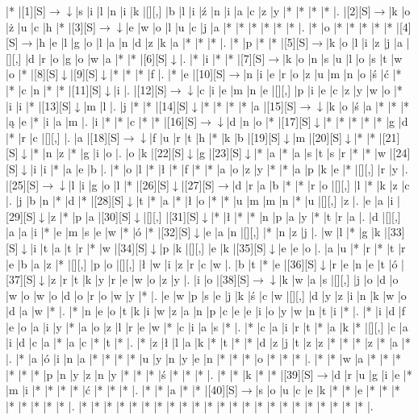 \documentclass[11pt]{article}
\newcommand\drarr{$\rightarrow \!\!\!\!\! \downarrow$}
\newcommand\rarr{$\rightarrow$}
\newcommand\darr{$\downarrow$}
\begin{document}
\noindent\begin{Puzzle}{22}{29}|*	|[1][S]\drarr	|s	|i	|l	|n	|i	|k	|[][,]{ }	|b	|l	|i	|ź	|n	|i	|a	|c	|z	|y	|*	|*	|*	|*	|.
|[2][S]\rarr	|k	|o	|ż	|u	|c	|h	|*	|[3][S]\drarr	|e	|w	|o	|l	|u	|c	|j	|a	|*	|*	|*	|*	|*	|*	|.
|*	|o	|*	|*	|*	|*	|*	|[4][S]\rarr	|h	|e	|l	|g	|o	|l	|a	|n	|d	|z	|k	|a	|*	|*	|*	|.
|*	|p	|*	|*	|[5][S]\rarr	|k	|o	|l	|i	|z	|j	|a	|[][,]{ }	|d	|r	|o	|g	|o	|w	|a	|*	|*	|[6][S]\darr	|.
|*	|i	|*	|*	|[7][S]\rarr	|k	|o	|n	|s	|u	|l	|o	|s	|t	|w	|o	|*	|[8][S]\darr	|[9][S]\darr	|*	|*	|*	|f	|.
|*	|e	|[10][S]\rarr	|n	|i	|e	|r	|o	|z	|u	|m	|n	|o	|ś	|ć	|*	|*	|c	|n	|*	|*	|[11][S]\darr	|i	|.
|[12][S]\drarr	|c	|i	|e	|m	|n	|e	|[][,]{ }	|p	|i	|e	|c	|z	|y	|w	|o	|*	|i	|i	|*	|[13][S]\darr	|m	|l	|.
|j	|*	|*	|[14][S]\darr	|*	|*	|*	|*	|a	|[15][S]\drarr	|k	|o	|ś	|a	|*	|*	|*	|ą	|e	|*	|i	|a	|m	|.
|i	|*	|*	|c	|*	|*	|[16][S]\drarr	|d	|n	|o	|*	|[17][S]\darr	|*	|*	|*	|*	|*	|g	|d	|*	|r	|c	|[][,]{ }	|.
|a	|[18][S]\drarr	|f	|u	|r	|t	|h	|*	|k	|b	|[19][S]\darr	|m	|[20][S]\darr	|*	|*	|[21][S]\darr	|*	|n	|z	|*	|g	|i	|o	|.
|o	|k	|[22][S]\darr	|g	|[23][S]\darr	|*	|a	|*	|a	|s	|t	|s	|r	|*	|*	|w	|[24][S]\darr	|i	|i	|*	|a	|e	|b	|.
|*	|o	|l	|*	|ł	|*	|f	|*	|*	|a	|o	|z	|y	|*	|*	|a	|p	|k	|e	|*	|[][,]{ }	|r	|y	|.
|[25][S]\drarr	|l	|i	|g	|o	|l	|*	|[26][S]\darr	|[27][S]\rarr	|d	|r	|a	|b	|*	|*	|r	|o	|[][,]{ }	|l	|*	|k	|z	|c	|.
|j	|b	|n	|*	|d	|*	|[28][S]\darr	|t	|*	|a	|*	|ł	|o	|*	|*	|u	|m	|m	|n	|*	|u	|[][,]{ }	|z	|.
|e	|a	|i	|[29][S]\darr	|z	|*	|p	|a	|[30][S]\darr	|[][,]{ }	|[31][S]\darr	|*	|ł	|*	|*	|n	|p	|a	|y	|*	|t	|r	|a	|.
|d	|[][,]{ }	|a	|a	|i	|*	|e	|m	|s	|e	|w	|*	|ó	|*	|[32][S]\darr	|e	|a	|n	|[][,]{ }	|*	|n	|z	|j	|.
|w	|l	|*	|g	|k	|[33][S]\darr	|i	|t	|a	|t	|r	|*	|w	|[34][S]\darr	|p	|k	|[][,]{ }	|e	|k	|[35][S]\darr	|e	|e	|o	|.
|a	|u	|*	|r	|*	|t	|r	|e	|b	|a	|z	|*	|[][,]{ }	|p	|o	|[][,]{ }	|ł	|w	|i	|z	|r	|c	|w	|.
|b	|t	|*	|e	|[36][S]\darr	|r	|e	|n	|e	|t	|ó	|[37][S]\darr	|z	|r	|t	|k	|y	|r	|e	|w	|o	|z	|y	|.
|i	|o	|[38][S]\drarr	|k	|w	|a	|s	|[][,]{ }	|j	|o	|d	|o	|w	|o	|w	|o	|d	|o	|r	|o	|w	|y	|*	|.
|e	|w	|p	|s	|e	|j	|k	|ś	|c	|w	|[][,]{ }	|d	|y	|z	|i	|n	|k	|w	|o	|d	|a	|w	|*	|.
|*	|n	|e	|o	|t	|k	|i	|w	|z	|a	|n	|p	|c	|e	|e	|i	|o	|y	|w	|n	|t	|i	|*	|.
|*	|i	|d	|f	|e	|o	|a	|i	|y	|*	|a	|o	|z	|l	|r	|e	|w	|*	|c	|i	|a	|s	|*	|.
|*	|c	|a	|i	|r	|t	|*	|a	|k	|*	|[][,]{ }	|c	|a	|i	|d	|c	|a	|*	|a	|c	|*	|t	|*	|.
|*	|z	|ł	|l	|a	|k	|*	|t	|*	|*	|d	|z	|j	|t	|z	|z	|*	|*	|*	|z	|*	|a	|*	|.
|*	|a	|ó	|i	|n	|a	|*	|*	|*	|*	|u	|y	|n	|y	|e	|n	|*	|*	|*	|o	|*	|*	|*	|.
|*	|*	|w	|a	|*	|*	|*	|*	|*	|*	|p	|n	|y	|z	|n	|y	|*	|*	|*	|ś	|*	|*	|*	|.
|*	|*	|k	|*	|*	|[39][S]\rarr	|d	|r	|u	|g	|i	|e	|*	|m	|i	|*	|*	|*	|*	|ć	|*	|*	|*	|.
|*	|*	|a	|*	|*	|[40][S]\rarr	|s	|o	|u	|c	|e	|k	|*	|*	|e	|*	|*	|*	|*	|*	|*	|*	|*	|.
|*	|*	|*	|*	|*	|*	|*	|*	|*	|*	|*	|*	|*	|*	|*	|*	|*	|*	|*	|*	|*	|*	|*	|.\end{Puzzle}
\end{document}
